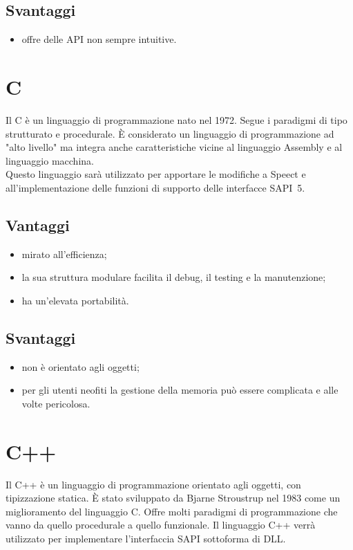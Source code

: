 \subsection*{Svantaggi}
\begin{itemize}
	\item offre delle API non sempre intuitive.
\end{itemize}
\section{C}
Il C è un linguaggio di programmazione nato nel 1972. Segue i paradigmi di tipo strutturato e procedurale. È considerato un linguaggio di programmazione ad "alto livello" ma integra anche caratteristiche vicine al linguaggio Assembly e al linguaggio macchina.\\
Questo linguaggio sarà utilizzato per apportare le modifiche a Speect e all'implementazione delle funzioni di supporto delle interfacce SAPI~5.
\subsection*{Vantaggi}
\begin{itemize}
	\item mirato all'efficienza;
	\item la sua struttura modulare facilita il debug, il testing e la manutenzione;
	\item ha un'elevata portabilità.
\end{itemize}
\subsection*{Svantaggi}
\begin{itemize}
	\item non è orientato agli oggetti;
	\item per gli utenti neofiti la gestione della memoria può essere complicata e alle volte pericolosa.~\cite{c-advantages-disadvantages}
\end{itemize}
\section{C++}
Il C++ è un linguaggio di programmazione orientato agli oggetti, con tipizzazione statica. È stato sviluppato da Bjarne Stroustrup nel 1983 come un miglioramento del linguaggio C.
Offre molti paradigmi di programmazione che vanno da quello procedurale a quello funzionale.
Il linguaggio C++ verrà utilizzato per implementare l'interfaccia SAPI sottoforma di DLL.
